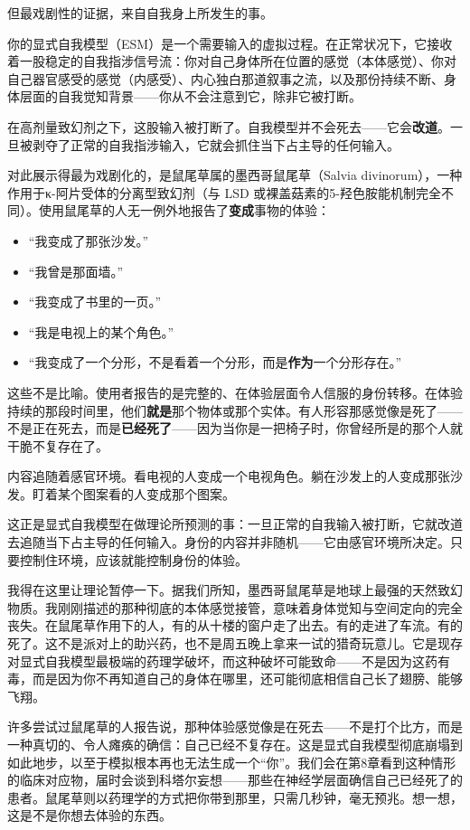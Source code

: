 \documentclass[11pt, twoside, openright]{book}
\begin{document}
但最戏剧性的证据，来自自我身上所发生的事。

你的显式自我模型（ESM）是一个需要输入的虚拟过程。在正常状况下，它接收着一股稳定的自我指涉信号流：你对自己身体所在位置的感觉（本体感觉）、你对自己器官感受的感觉（内感受）、内心独白那道叙事之流，以及那份持续不断、身体层面的自我觉知背景------你从不会注意到它，除非它被打断。

在高剂量致幻剂之下，这股输入被打断了。自我模型并不会死去------它会\textbf{改道}。一旦被剥夺了正常的自我指涉输入，它就会抓住当下占主导的任何输入。

对此展示得最为戏剧化的，是鼠尾草属的墨西哥鼠尾草（Salvia divinorum），一种作用于κ-阿片受体的分离型致幻剂（与 LSD 或裸盖菇素的5-羟色胺能机制完全不同）。使用鼠尾草的人无一例外地报告了\textbf{变成}事物的体验：

\begin{itemize}
  \item “我变成了那张沙发。”
  \item “我曾是那面墙。”
  \item “我变成了书里的一页。”
  \item “我是电视上的某个角色。”
  \item “我变成了一个分形，不是看着一个分形，而是\textbf{作为}一个分形存在。”
\end{itemize}

这些不是比喻。使用者报告的是完整的、在体验层面令人信服的身份转移。在体验持续的那段时间里，他们\textbf{就是}那个物体或那个实体。有人形容那感觉像是死了------不是正在死去，而是\textbf{已经死了}------因为当你是一把椅子时，你曾经所是的那个人就干脆不复存在了。

内容追随着感官环境。看电视的人变成一个电视角色。躺在沙发上的人变成那张沙发。盯着某个图案看的人变成那个图案。

这正是显式自我模型在做理论所预测的事：一旦正常的自我输入被打断，它就改道去追随当下占主导的任何输入。身份的内容并非随机------它由感官环境所决定。只要控制住环境，应该就能控制身份的体验。

我得在这里让理论暂停一下。据我们所知，墨西哥鼠尾草是地球上最强的天然致幻物质。我刚刚描述的那种彻底的本体感觉接管，意味着身体觉知与空间定向的完全丧失。在鼠尾草作用下的人，有的从十楼的窗户走了出去。有的走进了车流。有的死了。这不是派对上的助兴药，也不是周五晚上拿来一试的猎奇玩意儿。它是现存对显式自我模型最极端的药理学破坏，而这种破坏可能致命------不是因为这药有毒，而是因为你不再知道自己的身体在哪里，还可能彻底相信自己长了翅膀、能够飞翔。

许多尝试过鼠尾草的人报告说，那种体验感觉像是在死去------不是打个比方，而是一种真切的、令人瘫痪的确信：自己已经不复存在。这是显式自我模型彻底崩塌到如此地步，以至于模拟根本再也无法生成一个“你”。我们会在第8章看到这种情形的临床对应物，届时会谈到科塔尔妄想------那些在神经学层面确信自己已经死了的患者。鼠尾草则以药理学的方式把你带到那里，只需几秒钟，毫无预兆。想一想，这是不是你想去体验的东西。
\end{document}

